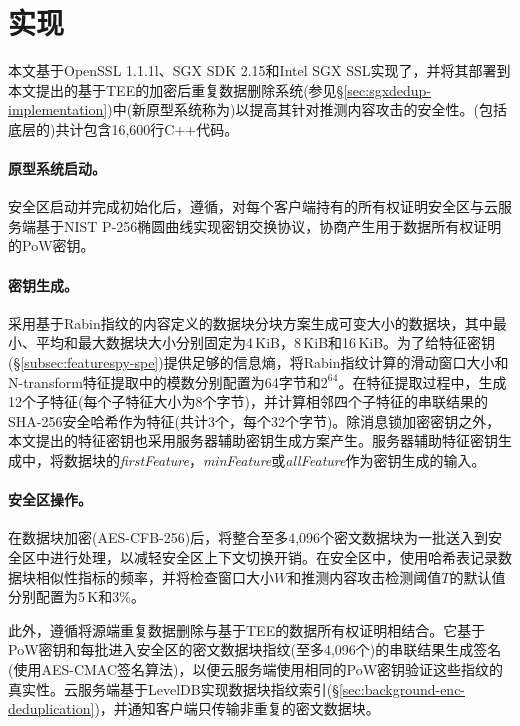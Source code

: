 \section{\prototype 实现}
\label{sec:featurespy-implementation}
本文基于OpenSSL 1.1.1l\cite{openssl}、SGX SDK 2.15\cite{sgxsdk}和Intel SGX SSL\cite{sgxssl}实现了\sysnameF，并将其部署到本文提出的基于TEE的加密后重复数据删除系统\sysnameS (参见\S\ref{sec:sgxdedup-implementation})中(新原型系统称为\prototype)以提高其针对推测内容攻击的安全性。\prototype(包括底层的\sysnameS )共计包含16,600行C++代码。

\paragraph*{原型系统启动。}
安全区启动并完成初始化后，\prototype 遵循\sysnameS，对每个客户端持有的所有权证明安全区与云服务端基于NIST P-256椭圆曲线\cite{nist}实现密钥交换协议，协商产生用于数据所有权证明的PoW密钥。

\paragraph*{密钥生成。}
\prototype 采用基于Rabin指纹\cite{rabin81}的内容定义的数据块分块方案生成可变大小的数据块，其中最小、平均和最大数据块大小分别固定为4\,KiB，8\,KiB和16\,KiB。为了给特征密钥(\S\ref{subsec:featurespy-spe})提供足够的信息熵，将Rabin指纹计算的滑动窗口大小和N-transform特征提取中的模数分别配置为64字节和$2^{64}$。在特征提取过程中，生成12个子特征(每个子特征大小为8个字节)，并计算相邻四个子特征的串联结果的SHA-256安全哈希作为特征(共计3个，每个32个字节)。除消息锁加密密钥之外，本文提出的特征密钥也采用服务器辅助密钥生成方案产生。服务器辅助特征密钥生成中，将数据块的\textit{firstFeature}，\textit{minFeature}或\textit{allFeature}作为密钥生成的输入。

\paragraph*{安全区操作。}
在数据块加密(AES-CFB-256)后，\prototype 将整合至多4,096个密文数据块为一批送入到安全区中进行处理，以减轻安全区上下文切换开销\cite{arnautov2016SCONE}。在安全区中，\prototype 使用哈希表记录数据块相似性指标的频率，并将检查窗口大小$W$和推测内容攻击检测阈值$T$的默认值分别配置为5\,K和3\%。

此外，\prototype 遵循\sysnameS 将源端重复数据删除与基于TEE的数据所有权证明相结合。它基于PoW密钥和每批进入安全区的密文数据块指纹(至多4,096个)的串联结果生成签名(使用AES-CMAC签名算法)，以便云服务端使用相同的PoW密钥验证这些指纹的真实性。云服务端基于LevelDB\cite{leveldb}实现数据块指纹索引(\S\ref{sec:background-enc-deduplication})，并通知客户端只传输非重复的密文数据块。

